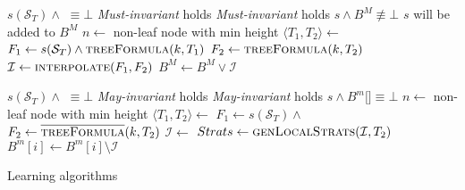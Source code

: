 \begin{algorithm}
    \begin{algorithmic}[1]
        \Require $s(\mathcal{S}_T) \land $  $\equiv \bot$
        \Require \emph{Must-invariant} holds
        \Ensure \emph{Must-invariant} holds
        \Ensure $s \land B^M \not\equiv \bot$
        \Comment $s$ will be added to $B^M$
                \Return
            \EndIIf
            \State $n \gets $ non-leaf node with min height 
            \State $\langle T_1, T_2 \rangle \gets $ 
            \State $F_1 \gets s(\mathcal{S}_T) \land \Call{treeFormula}{k, T_1}$
            \State $F_2 \gets \Call{treeFormula}{k, T_2}$
            \State $\mathcal{I} \gets  \Call{interpolate}{F_1, F_2}$
            \State $B^M \gets B^M \lor \mathcal{I}$
            \State {}
        \EndFunction
    \end{algorithmic}
    
    \begin{algorithmic}[1]
        \Require $s(\mathcal{S}_T) \land $  $\equiv \bot$
        \Require \emph{May-invariant} holds
        \Ensure \emph{May-invariant} holds
        \Ensure $s \land B^m[$$] \equiv \bot$
                \Return
            \EndIIf
            \State $n \gets $ non-leaf node with min height 
            \State $\langle T_1, T_2 \rangle \gets $ 
            \State $F_1 \gets s(\mathcal{S}_T) \land $ 
            \State $F_2 \gets \Call{\textoverline{treeFormula}}{k, T_2}$
            \State $\mathcal{I} \gets $ 
                \State $Strats \gets \Call{genLocalStrats}{\mathcal{I}, T_2}$\label{cstrats}
            \EndIf
                \State $B^m[i] \gets B^m[i] \setminus \mathcal{I}$
            \EndFor
            \State {}
        \EndFunction
    \end{algorithmic}
    \caption{Learning algorithms}
    \label{alg:learn}
\end{algorithm}

